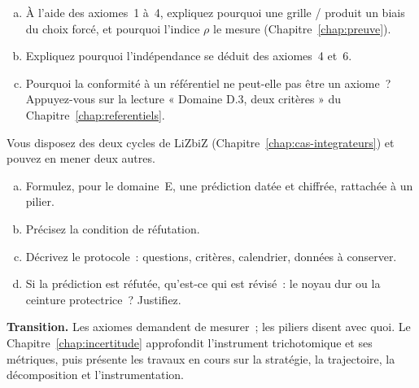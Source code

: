 \begin{boxexo}[title={\ding{45}\quad Exercice~21.2. Démontrer une proposition \niveaumoyen}]
\begin{enumerate}[(a)]
    \item À l'aide des axiomes~1 à~4, expliquez pourquoi une grille
          \OUI{}/\NON{} produit un biais du choix forcé, et pourquoi
          l'indice $\rho$ le mesure (Chapitre~\ref{chap:preuve}).
    \item Expliquez pourquoi l'indépendance se déduit des axiomes~4 et~6.
    \item Pourquoi la conformité à un référentiel ne peut-elle pas être un
          axiome~? Appuyez-vous sur la lecture « Domaine D.3, deux
          critères » du Chapitre~\ref{chap:referentiels}.
\end{enumerate}
\end{boxexo}

\begin{boxexo}[title={\ding{45}\quad Exercice~21.3. Formuler une prédiction réfutable \niveauexpert}]
Vous disposez des deux cycles de LiZbiZ (Chapitre~\ref{chap:cas-integrateurs})
et pouvez en mener deux autres.
\begin{enumerate}[(a)]
    \item Formulez, pour le domaine~E, une prédiction datée et chiffrée,
          rattachée à un pilier.
    \item Précisez la condition de réfutation.
    \item Décrivez le protocole~: questions, critères, calendrier, données
          à conserver.
    \item Si la prédiction est réfutée, qu'est-ce qui est révisé~: le noyau
          dur ou la ceinture protectrice~? Justifiez.
\end{enumerate}
\end{boxexo}

\bigskip

\begin{boxinfo}
\textbf{Transition.} Les axiomes demandent de mesurer~; les piliers disent
avec quoi. Le Chapitre~\ref{chap:incertitude} approfondit l'instrument
trichotomique et ses métriques, puis présente les travaux en cours sur
la stratégie, la trajectoire, la décomposition et l'instrumentation.
\end{boxinfo}
